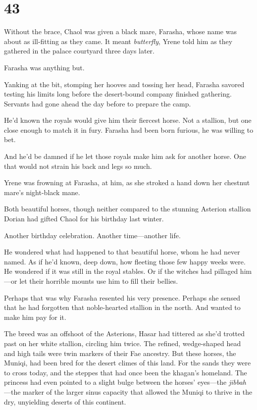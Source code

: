 
\chapter{43}

Without the brace, Chaol was given a black mare, Farasha, whose name was about as ill-fitting as they came. It meant \emph{butterfly}, Yrene told him as they gathered in the palace courtyard three days later.

Farasha was anything but.

Yanking at the bit, stomping her hooves and tossing her head, Farasha savored testing his limits long before the desert-bound company finished gathering. Servants had gone ahead the day before to prepare the camp.

He'd known the royals would give him their fiercest horse. Not a stallion, but one close enough to match it in fury. Farasha had been born furious, he was willing to bet.

And he'd be damned if he let those royals make him ask for another horse. One that would not strain his back and legs so much.

Yrene was frowning at Farasha, at him, as she stroked a hand down her chestnut mare's night-black mane.

Both beautiful horses, though neither compared to the stunning Asterion stallion Dorian had gifted Chaol for his birthday last winter.

Another birthday celebration. Another time---another life.

He wondered what had happened to that beautiful horse, whom he had never named. As if he'd known, deep down, how fleeting those few happy weeks were. He wondered if it was still in the royal stables. Or if the witches had pillaged him---or let their horrible mounts use him to fill their bellies.

Perhaps that was why Farasha resented his very presence. Perhaps she sensed that he had forgotten that noble-hearted stallion in the north. And wanted to make him pay for it.

The breed was an offshoot of the Asterions, Hasar had tittered as she'd trotted past on her white stallion, circling him twice. The refined, wedge-shaped head and high tails were twin markers of their Fae ancestry. But these horses, the Muniqi, had been bred for the desert climes of this land. For the sands they were to cross today, and the steppes that had once been the khagan's homeland. The princess had even pointed to a slight bulge between the horses' eyes---the \emph{jibbah}
---the marker of the larger sinus capacity that allowed the Muniqi to thrive in the dry, unyielding deserts of this continent.

